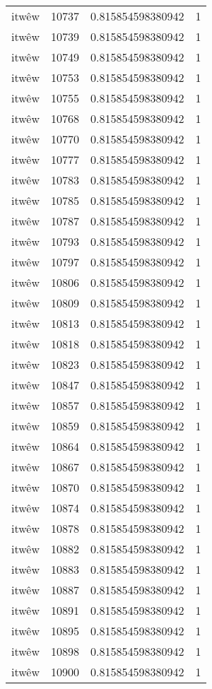 \begin{longtable}{llll}
itwêw & 10737 & 0.815854598380942 & 1 \\
itwêw & 10739 & 0.815854598380942 & 1 \\
itwêw & 10749 & 0.815854598380942 & 1 \\
itwêw & 10753 & 0.815854598380942 & 1 \\
itwêw & 10755 & 0.815854598380942 & 1 \\
itwêw & 10768 & 0.815854598380942 & 1 \\
itwêw & 10770 & 0.815854598380942 & 1 \\
itwêw & 10777 & 0.815854598380942 & 1 \\
itwêw & 10783 & 0.815854598380942 & 1 \\
itwêw & 10785 & 0.815854598380942 & 1 \\
itwêw & 10787 & 0.815854598380942 & 1 \\
itwêw & 10793 & 0.815854598380942 & 1 \\
itwêw & 10797 & 0.815854598380942 & 1 \\
itwêw & 10806 & 0.815854598380942 & 1 \\
itwêw & 10809 & 0.815854598380942 & 1 \\
itwêw & 10813 & 0.815854598380942 & 1 \\
itwêw & 10818 & 0.815854598380942 & 1 \\
itwêw & 10823 & 0.815854598380942 & 1 \\
itwêw & 10847 & 0.815854598380942 & 1 \\
itwêw & 10857 & 0.815854598380942 & 1 \\
itwêw & 10859 & 0.815854598380942 & 1 \\
itwêw & 10864 & 0.815854598380942 & 1 \\
itwêw & 10867 & 0.815854598380942 & 1 \\
itwêw & 10870 & 0.815854598380942 & 1 \\
itwêw & 10874 & 0.815854598380942 & 1 \\
itwêw & 10878 & 0.815854598380942 & 1 \\
itwêw & 10882 & 0.815854598380942 & 1 \\
itwêw & 10883 & 0.815854598380942 & 1 \\
itwêw & 10887 & 0.815854598380942 & 1 \\
itwêw & 10891 & 0.815854598380942 & 1 \\
itwêw & 10895 & 0.815854598380942 & 1 \\
itwêw & 10898 & 0.815854598380942 & 1 \\
itwêw & 10900 & 0.815854598380942 & 1 \\

\end{longtable}

